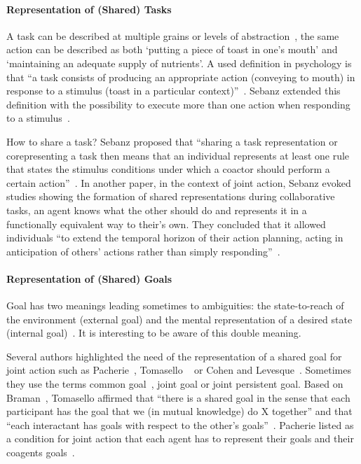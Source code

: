 \documentclass[a4paper,11pt,twoside]{StyleThese}
\begin{document}
\paragraph{Representation of (Shared) Tasks}
A task can be described at multiple grains or levels of abstraction~\cite{cooper_2000_contention},  the same action can be described
as both ‘putting a piece of toast in one’s mouth’ and ‘maintaining an adequate supply of nutrients’. A used definition in psychology is that ``a task consists of producing an appropriate action (\eg conveying to mouth) in response to a stimulus (\eg toast in a particular context)''~\cite[p.~1]{monsell_2003_task}. Sebanz \etal{} extended this definition with the possibility to execute more than one action when responding to a stimulus~\cite{sebanz_2005_two}. 

How to share a task? Sebanz \etal{} proposed that ``sharing a task representation or corepresenting a task then means that an individual represents at least one rule that states the stimulus conditions under which a coactor should perform a certain action''~\cite[p.~1235]{sebanz_2005_two}.
In another paper, in the context of joint action, Sebanz \etal{} evoked studies showing the formation of shared representations during collaborative tasks, \ie an agent knows what the other should do and represents it in a functionally equivalent way to their's own. They concluded that it allowed individuals ``to extend the temporal horizon of their action planning,
acting in anticipation of others’ actions rather than simply responding''~\cite[p.~73]{sebanz_2006_joint}.


\paragraph{Representation of (Shared) Goals}
Goal has two meanings leading sometimes to ambiguities: the state-to-reach of the environment (external goal) and the mental representation of a desired state (internal goal)~\cite{tomasello_2005_understanding}. It is interesting to be aware of this double meaning. 

Several authors highlighted the need of the representation of a shared goal for joint action such as Pacherie~\cite{pacherie_2012_agency}, Tomasello \etal{}~\cite{tomasello_2005_understanding} or Cohen and Levesque~\cite{cohen_1991_teamwork}. Sometimes they use the terms  common goal~\cite{searle_1990_collective}, joint goal or joint persistent goal.
Based on Braman~\cite{bratman_1992_coop}, Tomasello \etal{} affirmed that ``there is a shared goal in the sense that each participant has the goal that we (in mutual knowledge) do X together'' and that ``each interactant has goals with respect to the other’s goals''~\cite{tomasello_2005_understanding}. Pacherie listed as a condition for joint action that each agent has to represent their goals and their coagents goals~\cite{pacherie_2012_agency}.
\end{document}
